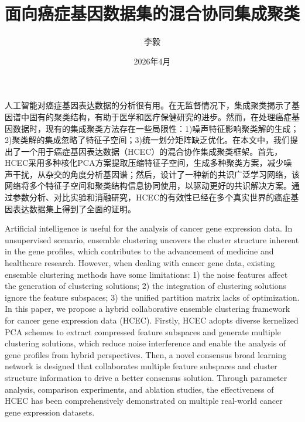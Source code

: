 \documentclass[unicode,pdfcover]{hquthesis}
\title{面向癌症基因数据集的混合协同集成聚类}
\author{李毅}
\institute{华侨大学工学院}
\date{2026年4月}
\begin{document}
\maketitle

\frontmatter

\begin{abstractCN}
人工智能对癌症基因表达数据的分析很有用。在无监督情况下，集成聚类揭示了基因谱中固有的聚类结构，有助于医学和医疗保健研究的进步。然而，在处理癌症基因数据时，现有的集成聚类方法存在一些局限性：1)噪声特征影响聚类解的生成；2)聚类解的集成忽略了特征子空间；3)统一划分矩阵缺乏优化。在本文中，我们提出了一个用于癌症基因表达数据（HCEC）的混合协作集成聚类框架。首先，HCEC采用多种核化PCA方案提取压缩特征子空间，生成多种聚类方案，减少噪声干扰，从杂交的角度分析基因谱；然后，设计了一种新的共识广泛学习网络，该网络将多个特征子空间和聚类结构信息协同使用，以驱动更好的共识解决方案。通过参数分析、对比实验和消融研究，HCEC的有效性已经在多个真实世界的癌症基因表达数据集上得到了全面的证明。


\end{abstractCN}

\begin{abstractEN}
Artificial intelligence is useful for the analysis of cancer gene expression data. In unsupervised scenario, ensemble clustering uncovers the cluster structure inherent in the gene profiles, which contributes to the advancement of medicine and healthcare research. However, when dealing with cancer gene data, existing ensemble clustering methods have some limitations: 1) the noise features affect the generation of clustering solutions; 2) the integration of clustering solutions ignore the feature subspaces; 3) the unified partition matrix lacks of optimization. In this paper, we propose a hybrid collaborative ensemble clustering framework for cancer gene expression data (HCEC). Firstly, HCEC adopts diverse kernelized PCA schemes to extract compressed feature subspaces and generate multiple clustering solutions, which reduce noise interference and enable the analysis of gene profiles from hybrid perspectives. Then, a novel consensus broad learning network is designed that collaborates multiple feature subspaces and cluster structure information to drive a better consensus solution. Through parameter analysis, comparison experiments, and ablation studies, the effectiveness of HCEC has been comprehensively demonstrated on multiple real-world cancer gene expression datasets.


\end{abstractEN}
\end{document}

